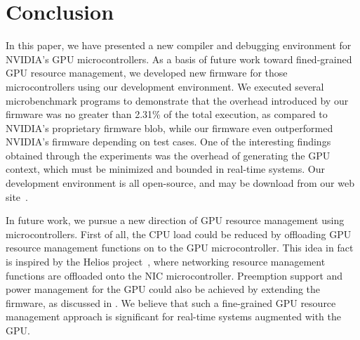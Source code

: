 
\section{Conclusion}\label{sec:con}

In this paper, we have presented a new compiler and debugging
environment for NVIDIA's GPU microcontrollers.
As a basis of future work toward fined-grained GPU resource management,
we developed new firmware for those microcontrollers using our
development environment.
We executed several microbenchmark programs to demonstrate that the
overhead introduced by our firmware was no greater than 2.31\% of the
total execution, as compared to NVIDIA's proprietary firmware blob,
while our firmware even outperformed NVIDIA's firmware depending on test
cases.
One of the interesting findings obtained through the experiments was the
overhead of generating the GPU context, which must be minimized and
bounded in real-time systems.
Our development environment is all open-source, and may be download from
our web site~\cite{GIT_GDEV, GIT_FARM, GIT_NVFC}.

In future work, we pursue a new direction of GPU resource management
using microcontrollers.
First of all, the CPU load could be reduced by offloading GPU resource
management functions on to the GPU microcontroller.
This idea in fact is inspired by the Helios
project~\cite{Nightingale_SOSP09}, where networking resource management
functions are offloaded onto the NIC microcontroller.
Preemption support and power management for the GPU could also be
achieved by extending the firmware, as discussed in \cite{Kato_OSPERT11}.
We believe that such a fine-grained GPU resource management approach is
significant for real-time systems augmented with the GPU.
